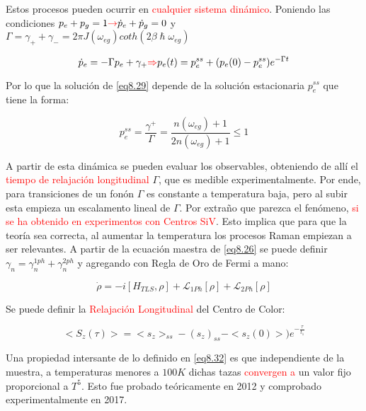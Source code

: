 \documentclass{book}
\begin{document}
Estos procesos pueden ocurrir en \textcolor{red}{cualquier sistema dinámico}. Poniendo las condiciones $p_e+p_g=1 \textcolor{red}{\rightarrow} \dot{p}_e+\dot{p}_g=0$ y $\Gamma=\gamma_++\gamma_-=2\pi J(\omega_{eg})coth(2\beta\hslash\omega_{eg})$

\begin{equation}\label{eq8.29}\dot{p}_e=-\Gamma p_e+\gamma_+\textcolor{red}{\Rightarrow}p_e(t)=p_e^{ss}+(p_e(0)-p_e^{ss})e^{-\Gamma t}\end{equation}

Por lo que la solución de \ref{eq8.29} depende de la solución estacionaria $p_e^{ss}$ que tiene la forma:

\begin{equation}\label{eq8.30}p_e^{ss}=\frac{\gamma^+}{\Gamma}=\frac{n(\omega_{eg})+1}{2n(\omega_{eg})+1}\leq 1\end{equation}

A partir de esta dinámica se pueden evaluar los observables, obteniendo de allí el \textcolor{red}{tiempo de relajación longitudinal} $\Gamma$, que es medible experimentalmente. Por ende, para transiciones de un fonón $\Gamma$ es constante a temperatura baja, pero al subir esta empieza un escalamento lineal de $\Gamma$. Por extraño que parezca el fenómeno, \textcolor{red}{si se ha obtenido en experimentos con Centros SiV}. Esto implica que para que la teoría sea correcta, al aumentar la temperatura los procesos Raman empiezan a ser relevantes. A partir de la ecuación maestra de \ref{eq8.26} se puede definir $\gamma_n=\gamma_n^{1ph}+\gamma_n^{2ph}$ y agregando con Regla de Oro de Fermi a mano:

\begin{equation}\label{eq8.31}\dot{\rho}=-i[H_{TLS},\rho]+\mathcal{L}_{1Ph}[\rho]+\mathcal{L}_{2Ph}[\rho]\end{equation}

Se puede definir la \textcolor{red}{Relajación Longitudinal} del Centro de Color:

\begin{equation}\label{eq8.32}<S_z(\tau)>=<s_z>_{ss}-(s_z)_{ss}-<s_z(0)>)e^{-\frac{\tau}{t_1}}\end{equation}

Una propiedad intersante de lo definido en \ref{eq8.32} es que independiente de la muestra, a temperaturas menores a $100K$ dichas tazas \textcolor{red}{convergen a} un valor fijo proporcional a $T^5$. Esto fue probado teóricamente en 2012 y comprobado experimentalmente en 2017. 
\end{document}
